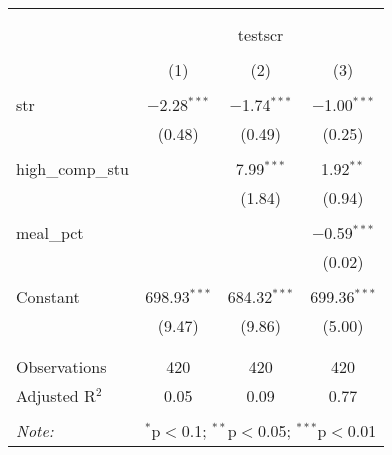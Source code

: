 
\begin{tabular}{@{\extracolsep{5pt}}lccc} 
\\[-1.8ex]\hline 
\hline \\[-1.8ex] 
\\[-1.8ex] & \multicolumn{3}{c}{testscr} \\ 
\\[-1.8ex] & (1) & (2) & (3)\\ 
\hline \\[-1.8ex] 
 str & $-$2.28$^{***}$ & $-$1.74$^{***}$ & $-$1.00$^{***}$ \\ 
  & (0.48) & (0.49) & (0.25) \\ 
  & & & \\ 
 high\_comp\_stu &  & 7.99$^{***}$ & 1.92$^{**}$ \\ 
  &  & (1.84) & (0.94) \\ 
  & & & \\ 
 meal\_pct &  &  & $-$0.59$^{***}$ \\ 
  &  &  & (0.02) \\ 
  & & & \\ 
 Constant & 698.93$^{***}$ & 684.32$^{***}$ & 699.36$^{***}$ \\ 
  & (9.47) & (9.86) & (5.00) \\ 
  & & & \\ 
\hline \\[-1.8ex] 
Observations & 420 & 420 & 420 \\ 
Adjusted R$^{2}$ & 0.05 & 0.09 & 0.77 \\ 
\hline 
\hline \\[-1.8ex] 
\textit{Note:}  & \multicolumn{3}{r}{$^{*}$p$<$0.1; $^{**}$p$<$0.05; $^{***}$p$<$0.01} \\ 
\end{tabular} 
